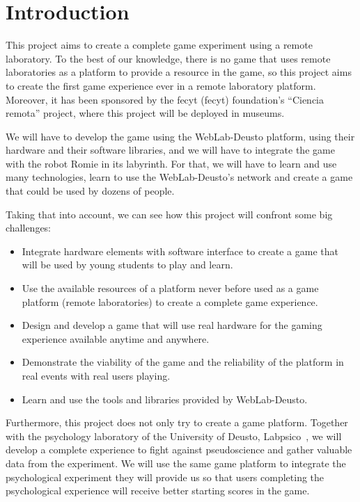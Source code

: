 \chapter{Introduction}

This project aims to create a complete game experiment using a remote laboratory. To the best of our
knowledge, there is no game that uses remote laboratories as a platform to provide a resource in the
game, so this project aims to create the first game experience ever in a remote laboratory platform.
Moreover, it has been sponsored by the \acrshort{fecyt} (\acrlong{fecyt}) foundation's ``Ciencia
remota'' project, where this project will be deployed in museums.

We will have to develop the game using the WebLab-Deusto platform, using their hardware and their
software libraries, and we will have to integrate the game with the robot Romie in its labyrinth.
For that, we will have to learn and use many technologies, learn to use the WebLab-Deusto's network
and create a game that could be used by dozens of people.

Taking that into account, we can see how this project will confront some big challenges:

\begin{itemize}

	\item Integrate hardware elements with software interface to create a game that will be used by
	young students to play and learn.

	\item Use the available resources of a platform never before used as a game platform (remote
	laboratories) to create a complete game experience.

	\item Design and develop a game that will use real hardware for the gaming experience available
	anytime and anywhere.

	\item Demonstrate the viability of the game and the reliability of the platform in real events
	with real users playing.

	\item Learn and use the tools and libraries provided by WebLab-Deusto.

\end{itemize}

Furthermore, this project does not only try to create a game platform. Together with the psychology
laboratory of the University of Deusto, Labpsico~\cite{labpsico_web}, we will develop a complete
experience to fight against pseudoscience and gather valuable data from the experiment. We will use
the same game platform to integrate the psychological experiment they will provide us so that users
completing the psychological experience will receive better starting scores in the game.

